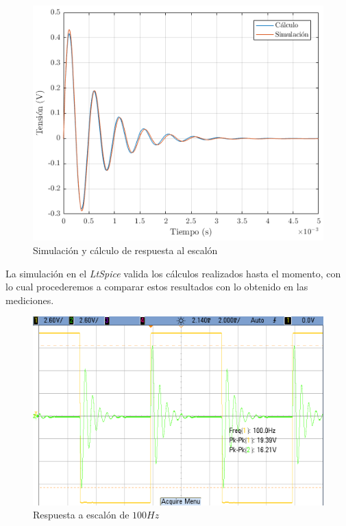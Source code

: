 \documentclass[../../tc_tp3_main.tex]{subfiles}
\begin{document}
\begin{figure}[H]
	\centering
  	\includegraphics[scale = 0.7]{imagenes/tc_tp3_ej1_rtaesc.png}
  	\caption{Simulaci\'on y c\'alculo de respuesta al escal\'on}
  	\label{fig:1-rtaesc-spice}
\end{figure}

La simulaci\'on en el \textit{LtSpice} valida los c\'alculos realizados hasta el momento, con lo cual procederemos a comparar estos resultados con lo obtenido en las mediciones.

\begin{figure}[H]
	\centering
  	\includegraphics[scale = 0.32]{imagenes/tc_tp3_ej1_100Hz.png}
  	\caption{Respuesta a escal\'on de $100Hz$}
  	\label{fig:1-rtaesc-100Hz}
\end{figure}
\end{document}
